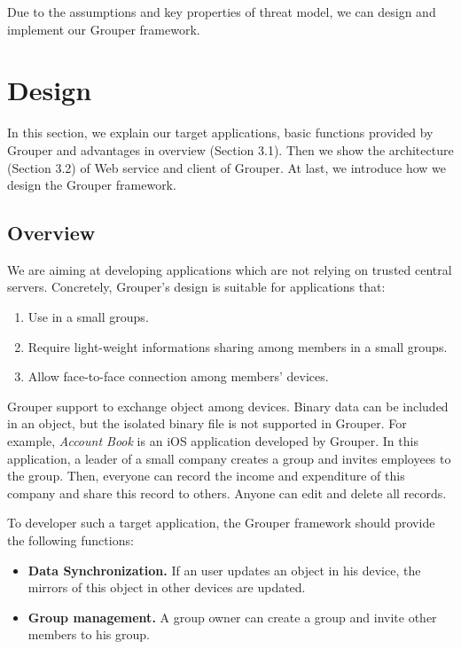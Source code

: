 \documentclass[twocolumn,10pt]{article}
\begin{document}
Due to the assumptions and key properties of threat model, we can design and implement our Grouper framework.

\section{Design}

In this section, we explain our target applications, basic functions provided by Grouper and advantages in overview (Section 3.1). Then we show the architecture (Section 3.2) of Web service and client of Grouper. At last, we introduce how we design the Grouper framework.

\subsection{Overview}

We are aiming at developing applications which are not relying on trusted central servers.
Concretely, Grouper's design is suitable for applications that:

\begin{enumerate}
	\setlength{\itemsep}{1pt}
	\setlength{\parskip}{0pt}
	\setlength{\parsep}{0pt}
	\item Use in a small groups.
	\item Require light-weight informations sharing among members in a small groups.
	\item Allow face-to-face connection among members' devices.
\end{enumerate}

Grouper support to exchange object among devices.
Binary data can be included in an object, but the isolated binary file is not supported in Grouper.
For example, \emph{Account Book} is an iOS application developed by Grouper. 
In this application, a leader of a small company creates a group and invites employees to the group. 
Then, everyone can record the income and expenditure of this company and share this record to others.
Anyone can edit and delete all records.

To developer such a target application, the Grouper framework should provide the following functions:

\begin{itemize}
	\setlength{\itemsep}{1pt}
	\setlength{\parskip}{0pt}
	\setlength{\parsep}{0pt}
	\item \textbf{Data Synchronization.} If an user updates an object in his device, the mirrors of this object in other devices are updated.
	\item \textbf{Group management.} A group owner can create a group and invite other members to his group.
\end{itemize}
\end{document}
